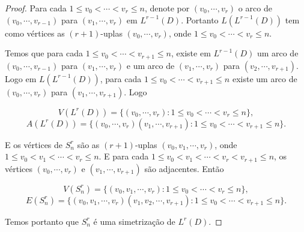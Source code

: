 \begin{proof}
Para cada $1\leq v_0 < \cdots < v_{r} \leq n$, denote por $(v_0,\cdots,v_{r})$ o arco de $(v_0,\cdots,v_{r-1})$ para $(v_1,\cdots,v_r)$ em $L^{r-1}(D)$. Portanto $L(L^{r-1}(D))$ tem como vértices as $(r+1)$-uplas $(v_0,\cdots,v_{r})$, onde $1\leq v_0 < \cdots < v_r \leq n$.

Temos que para cada $1\leq v_0 < \cdots < v_{r+1} \leq n$, existe em $L^{r-1}(D)$ um arco de $(v_0,\cdots,v_{r-1})$ para $(v_1,\cdots,v_r)$ e um arco de $(v_1,\cdots,v_{r})$ para $(v_2,\cdots,v_{r+1})$. Logo em $L(L^{r-1}(D))$, para cada $1\leq v_0 < \cdots < v_{r+1} \leq n$ existe um arco de $(v_0,\cdots,v_{r})$ para $(v_1,\cdots,v_{r+1})$. Logo

\[V(L^r(D)) = \{(v_0,\cdots,v_{r}) : 1\leq v_0 < \cdots < v_r \leq n\},\]
\[A(L^r(D)) = \{(v_0,\cdots,v_{r})(v_1,\cdots,v_{r+1}) : 1\leq v_0 < \cdots < v_{r+1} \leq n\}.\]

E os vértices de $S_n^r$ são as $(r+1)$-uplas $(v_0, v_1, \cdots, v_r)$, onde $1\leq v_0 < v_1 < \cdots < v_r \leq n$. E para cada $1 \leq v_0 < v_1 <\cdots < v_r < v_{r+1} \leq n$, os vértices $(v_0, \cdots, v_r)$ e $(v_1, \cdots, v_{r+1})$ são adjacentes. Então 

\[V(S_n^r) = \{(v_0, v_1, \cdots, v_r) : 1 \leq v_0 < \cdots < v_r \leq n\},\]
\[E(S_n^r) = \{(v_0, v_1, \cdots, v_r)(v_1, v_2, \cdots, v_{r+1}) : 1 \leq v_0 < \cdots < v_{r+1} \leq n\}.\]




Temos portanto que $S_n^r$ é uma simetrização de $L^r(D)$.
\end{proof}

